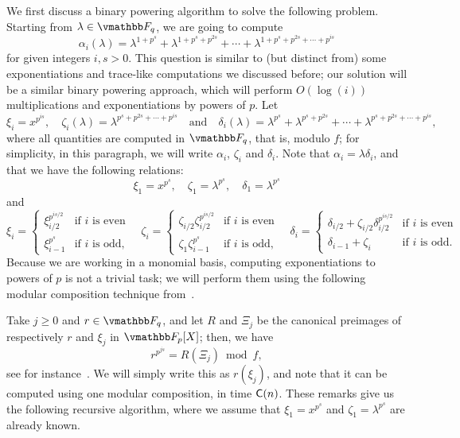 We first discuss a binary powering algorithm to solve the following
problem. Starting from $\lambda \in \F_q$, we are going to compute
$$
\alpha_i(\lambda) = \lambda^{1 + p^s} + \lambda^{1 + p^s + p^{2s}} + \cdots + \lambda^{1 + p^s + p^{2s} + \cdots + p^{is}}
$$ for given integers $i, s > 0$. This question is similar to (but
distinct from) some exponentiations and trace-like computations we
discussed before; our solution will be a similar binary powering 
approach, which will perform $O(\log(i))$ multiplications and
exponentiations by powers of $p$. Let
$$
\xi_i = x^{p^{is}},
\quad 
\zeta_i(\lambda) = \lambda^{p^s + p^{2s} + \cdots + p^{is}} 
\quad\text{and}\quad 
\delta_i(\lambda) = \lambda^{p^s} + \lambda^{p^s + p^{2s}} + \cdots + \lambda^{p^s + p^{2s} + \cdots + p^{is}},
$$ where all quantities are computed in $\F_q$, that is, modulo $f$;
for simplicity, in this paragraph, we will write $\alpha_i$, $\zeta_i$
and $\delta_i$. Note that $\alpha_i=\lambda \delta_i$, and that we
have the following relations:
$$\xi_1 = x^{p^s}, \quad \zeta_1 = \lambda^{p^s}, \quad \delta_1 = \lambda^{p^s}$$
and
$$
\xi_i =
\begin{cases}
\xi_{i / 2}^{p^{is / 2}} & \text{if $i$ is even}  \\
\xi_{i - 1}^{p^s} & \text{if $i$ is odd,}
\end{cases} \quad
\zeta_i = 
\begin{cases}
\zeta_{i / 2}\zeta_{i / 2}^{p^{is / 2}} & \text{if $i$ is even}  \\
\zeta_1\zeta_{i - 1}^{p^s} & \text{if $i$ is odd,}
\end{cases} \quad
\delta_i = 
\begin{cases}
\delta_{i / 2} + \zeta_{i / 2}\delta_{i / 2}^{p^{is / 2}} & \text{if $i$ is even}  \\
\delta_{i-1} + \zeta_i & \text{if $i$ is odd.}
\end{cases}$$
Because we are working in a monomial basis, computing exponentiations
to powers of $p$ is not a trivial task; we will perform them using the
following modular composition technique from~\cite{GaSh92}.

Take $j \ge 0$ and $r\in \F_q$, and let $R$ and $\Xi_j$ be the
canonical preimages of respectively $r$ and $\xi_j$ in $\F_p[X]$;
then, we have
$$r^{p^{js}} = R(\Xi_j) \bmod f,$$ see for instance~\cite[Chapter
  14.7]{GaGe03}. We will simply write this as $r(\xi_j)$, and note
that it can be computed using one modular composition, in time
$\mathsf{C}(n)$. These remarks give us the following recursive algorithm,
where we assume that $\xi_1=x^{p^s}$ and $\zeta_1=\lambda^{p^s}$ are already
known.

